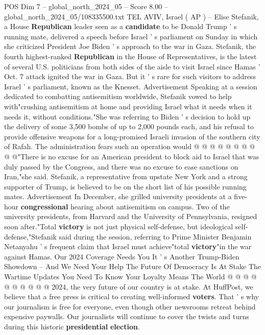 \begin{textsample}{POS Dim 7 – global\_north\_2024\_05 – Score 8.00 – global\_north\_2024\_05/108335500.txt}  \label{ex:f7_pos_059}
TEL AVIV, Israel ( AP ) -- Elise Stefanik, a House \textbf{Republican} leader seen as a \textbf{candidate} to be Donald Trump ' s running mate, delivered a speech before Israel ' s parliament on Sunday in which she criticized President Joe Biden ' s approach to the war in Gaza.
Stefanik, the fourth highest-ranked \textbf{Republican} in the House of Representatives, is the latest of several U.S. politicians from both sides of the aisle to visit Israel since Hamas ' Oct. 7 attack ignited the war in Gaza.
But it ' s rare for such visitors to address Israel ' s parliament, known as the Knesset.
Advertisement Speaking at a session dedicated to combatting antisemitism worldwide, Stefanik vowed to help with"crushing antisemitism at home and providing Israel what it needs when it needs it, without conditions."She was referring to Biden ' s decision to hold up the delivery of some 3,500 bombs of up to 2,000 pounds each, and his refusal to provide offensive weapons for a long-promised Israeli invasion of the southern city of Rafah.
The administration fears such an operation would @ @ @ @ @ @ @ @ @ @"There is no excuse for an American president to block aid to Israel that was duly passed by the Congress, and there was no excuse to ease sanctions on Iran,"she said.
Stefanik, a representative from upstate New York and a strong supporter of Trump, is believed to be on the short list of his possible running mates.
Advertisement In December, she grilled university presidents at a five-hour \textbf{congressional} hearing about antisemitism on campus.
Two of the university presidents, from Harvard and the University of Pennsylvania, resigned soon after."Total \textbf{victory} is not just physical self-defense, but ideological self-defense,"Stefanik said during the session, referring to Prime Minister Benjamin Netanyahu ' s frequent claim that Israel must achieve"total \textbf{victory}"in the war against Hamas.
Our 2024 Coverage Needs You It ' s Another Trump-Biden Showdown -- And We Need Your Help The Future Of Democracy Is At Stake The Wartime Updates You Need To Know Your Loyalty Means The World @ @ @ @ @ @ @ @ @ @ 2024, the very future of our country is at stake.
At HuffPost, we believe that a free press is critical to creating well-informed \textbf{voters}.
That ' s why our journalism is free for everyone, even though other newsrooms retreat behind expensive paywalls.
Our journalists will continue to cover the twists and turns during this historic \textbf{presidential} \textbf{election}.

\end{textsample}
